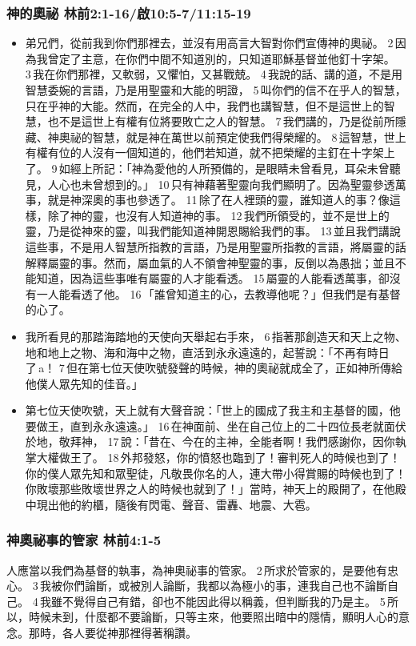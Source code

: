 \subsubsection{神的奧祕 林前2:1-16/啟10:5-7/11:15-19}
\begin{itemize}
\item 弟兄們，從前我到你們那裡去，並沒有用高言大智對你們宣傳神的奧祕。 2 因為我曾定了主意，在你們中間不知道別的，只知道耶穌基督並他釘十字架。 3 我在你們那裡，又軟弱，又懼怕，又甚戰兢。 4 我說的話、講的道，不是用智慧委婉的言語，乃是用聖靈和大能的明證， 5 叫你們的信不在乎人的智慧，只在乎神的大能。然而，在完全的人中，我們也講智慧，但不是這世上的智慧，也不是這世上有權有位將要敗亡之人的智慧。 7 我們講的，乃是從前所隱藏、神奧祕的智慧，就是神在萬世以前預定使我們得榮耀的。 8 這智慧，世上有權有位的人沒有一個知道的，他們若知道，就不把榮耀的主釘在十字架上了。 9 如經上所記：「神為愛他的人所預備的，是眼睛未曾看見，耳朵未曾聽見，人心也未曾想到的。」 10 只有神藉著聖靈向我們顯明了。因為聖靈參透萬事，就是神深奧的事也參透了。 11 除了在人裡頭的靈，誰知道人的事？像這樣，除了神的靈，也沒有人知道神的事。 12 我們所領受的，並不是世上的靈，乃是從神來的靈，叫我們能知道神開恩賜給我們的事。 13 並且我們講說這些事，不是用人智慧所指教的言語，乃是用聖靈所指教的言語，將屬靈的話解釋屬靈的事。然而，屬血氣的人不領會神聖靈的事，反倒以為愚拙；並且不能知道，因為這些事唯有屬靈的人才能看透。 15 屬靈的人能看透萬事，卻沒有一人能看透了他。 16 「誰曾知道主的心，去教導他呢？」但我們是有基督的心了。
\item 我所看見的那踏海踏地的天使向天舉起右手來， 6 指著那創造天和天上之物、地和地上之物、海和海中之物，直活到永永遠遠的，起誓說：「不再有時日了 a！ 7 但在第七位天使吹號發聲的時候，神的奧祕就成全了，正如神所傳給他僕人眾先知的佳音。」
\item 第七位天使吹號，天上就有大聲音說：「世上的國成了我主和主基督的國，他要做王，直到永永遠遠。」 16 在神面前、坐在自己位上的二十四位長老就面伏於地，敬拜神， 17 說：「昔在、今在的主神，全能者啊！我們感謝你，因你執掌大權做王了。 18 外邦發怒，你的憤怒也臨到了！審判死人的時候也到了！你的僕人眾先知和眾聖徒，凡敬畏你名的人，連大帶小得賞賜的時候也到了！你敗壞那些敗壞世界之人的時候也就到了！」當時，神天上的殿開了，在他殿中現出他的約櫃，隨後有閃電、聲音、雷轟、地震、大雹。
\end{itemize}

\subsubsection{神奧祕事的管家 林前4:1-5}
人應當以我們為基督的執事，為神奧祕事的管家。 2 所求於管家的，是要他有忠心。 3 我被你們論斷，或被別人論斷，我都以為極小的事，連我自己也不論斷自己。 4 我雖不覺得自己有錯，卻也不能因此得以稱義，但判斷我的乃是主。 5 所以，時候未到，什麼都不要論斷，只等主來，他要照出暗中的隱情，顯明人心的意念。那時，各人要從神那裡得著稱讚。

